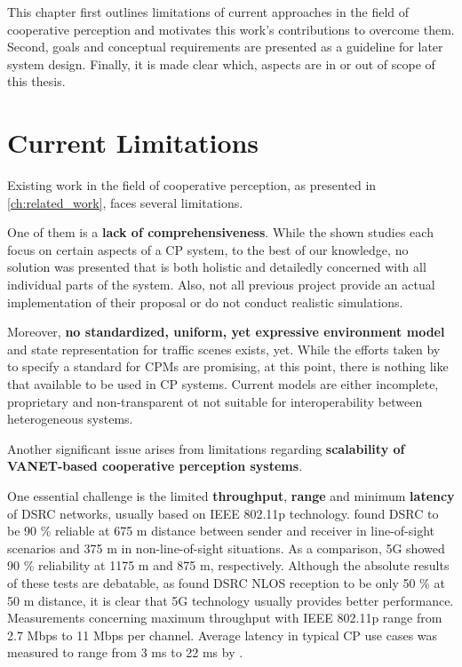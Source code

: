 This chapter first outlines limitations of current approaches in the field of cooperative perception and motivates this work's contributions to overcome them. Second, goals and conceptual requirements are presented as a guideline for later system design. Finally, it is made clear which, aspects are in or out of scope of this thesis.

\section{Current Limitations}
\label{sec:problem_analysis:current_limitations}

Existing work in the field of cooperative perception, as presented in \autoref{ch:related_work}, faces several limitations.
\par
\bigskip

One of them is a \textbf{lack of comprehensiveness}. While the shown studies each focus on certain aspects of a CP system, to the best of our knowledge, no solution was presented that is both holistic and detailedly concerned with all individual parts of the system. Also, not all previous project provide an actual implementation of their proposal or do not conduct realistic simulations.
\par
\bigskip

Moreover, \textbf{no standardized, uniform, yet expressive environment model} and state representation for traffic scenes exists, yet. While the efforts taken by \cite{EuropeanTelecommunicationsStandardsInstituteETSI2019} to specify a standard for CPMs are promising, at this point, there is nothing like that available to be used in CP systems. Current models are either incomplete, proprietary and non-transparent ot not suitable for interoperability between heterogeneous systems. 
\par
\bigskip

Another significant issue arises from limitations regarding \textbf{scalability of VANET-based cooperative perception systems}.

One essential challenge is the limited \textbf{throughput}, \textbf{range} and minimum \textbf{latency} of DSRC networks, usually based on IEEE 802.11p technology. \cite{5GAutomotiveAssociation2018} found DSRC to be 90 \% reliable at 675 m distance between sender and receiver in line-of-sight scenarios and 375 m in non-line-of-sight situations. As a comparison, 5G showed 90 \% reliability at 1175 m and 875 m, respectively. Although the absolute results of these tests are debatable, as \cite{Mangel2011} found DSRC NLOS reception to be only 50 \% at 50 m distance, it is clear that 5G technology usually provides better performance. Measurements concerning maximum throughput with IEEE 802.11p range from 2.7 Mbps to 11 Mbps per channel. Average latency in typical CP use cases was measured to range from 3 ms to 22 ms by \cite{Rauch2011}.

